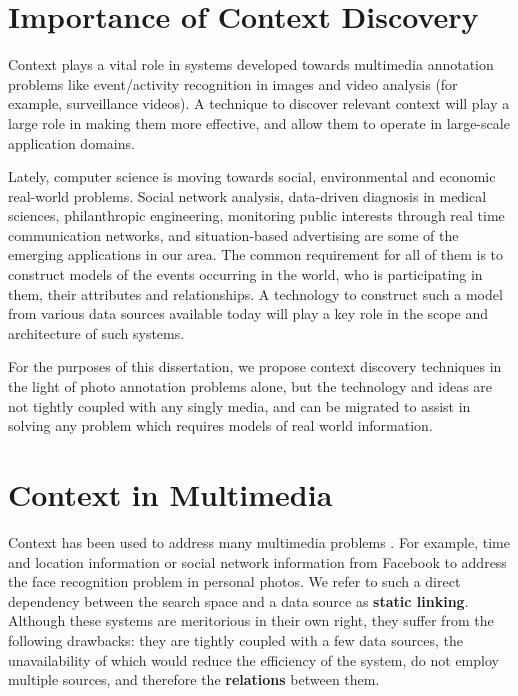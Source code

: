 \section{Importance of Context Discovery}

Context plays a vital role in systems developed towards multimedia annotation problems like event/activity recognition in images and video analysis (for example, surveillance videos). A technique to discover relevant context will play a large role in making them more effective, and allow them to operate in large-scale application domains.

Lately, computer science is moving towards social, environmental and economic real-world problems. Social network analysis, data-driven diagnosis in medical sciences, philanthropic engineering, monitoring public interests through real time communication networks, and situation-based advertising are some of the emerging applications in our area. The common requirement for all of them is to construct models of the events occurring in the world, who is participating in them, their attributes and relationships. A technology to construct such a model from various data sources available today will play a key role in the scope and architecture of such systems.

For the purposes of this dissertation, we propose context discovery techniques in the light of photo annotation problems alone, but the technology and ideas are not tightly coupled with any singly media, and can be migrated to assist in solving any problem which requires models of real world information.

\section{Context in Multimedia}

Context has been used to address many multimedia problems \cite{henter2012tag, li2012fusing, naaman2005identity, o2009context,stone2008autotagging}. For example, time and location information or social network information from Facebook to address the face recognition problem in personal photos. We refer to such a direct dependency between the search space and a data source as \textbf{static linking}. Although these systems are meritorious in their own right, they suffer from the following drawbacks: they are tightly coupled with a few data sources, the unavailability of which would reduce the efficiency of the system, do not employ multiple sources, and therefore the \textbf{relations} between them. 

